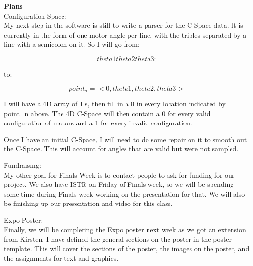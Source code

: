 \textbf{Plans} \\ 
Configuration Space: \\ 
My next step in the software is still to write a parser for the C-Space data. It is currently in the form of one motor angle per line, with the triples separated by a line with a semicolon on it. So I will go from:

\[ theta1 theta2 theta3 ; \]

to:

\[ point_n = <0, theta1, theta2, theta3> \]

I will have a 4D array of 1's, then fill in a 0 in every location indicated by point\_n above. The 4D C-Space will then contain a 0 for every valid configuration of motors and a 1 for every invalid configuration.

Once I have an initial C-Space, I will need to do some repair on it to smooth out the C-Space. This will account for angles that are valid but were not sampled.

Fundraising: \\ 
My other goal for Finals Week is to contact people to ask for funding for our project. We also have ISTR on Friday of Finals week, so we will be spending some time during Finals week working on the presentation for that. We will also be finishing up our presentation and video for this class.

Expo Poster: \\ 
Finally, we will be completing the Expo poster next week as we got an extension from Kirsten. I have defined the general sections on the poster in the poster template. This will cover the sections of the poster, the images on the poster, and the assignments for text and graphics.

